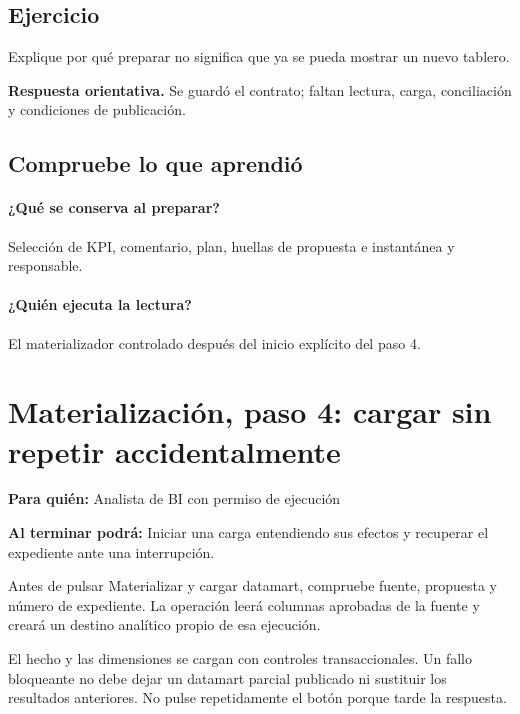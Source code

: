 \subsection{Ejercicio}
Explique por qué preparar no significa que ya se pueda mostrar un nuevo tablero.

\textbf{Respuesta orientativa.} Se guardó el contrato; faltan lectura, carga, conciliación y condiciones de publicación.

\subsection{Compruebe lo que aprendió}
\paragraph{¿Qué se conserva al preparar?} Selección de KPI, comentario, plan, huellas de propuesta e instantánea y responsable.

\paragraph{¿Quién ejecuta la lectura?} El materializador controlado después del inicio explícito del paso 4.


\section{Materialización, paso 4: cargar sin repetir accidentalmente}
\label{unidad:ETL04}
\textbf{Para quién:} Analista de BI con permiso de ejecución\par
\textbf{Al terminar podrá:} Iniciar una carga entendiendo sus efectos y recuperar el expediente ante una interrupción.

Antes de pulsar Materializar y cargar datamart, compruebe fuente, propuesta y número de expediente. La operación leerá columnas aprobadas de la fuente y creará un destino analítico propio de esa ejecución.

El hecho y las dimensiones se cargan con controles transaccionales. Un fallo bloqueante no debe dejar un datamart parcial publicado ni sustituir los resultados anteriores. No pulse repetidamente el botón porque tarde la respuesta.

